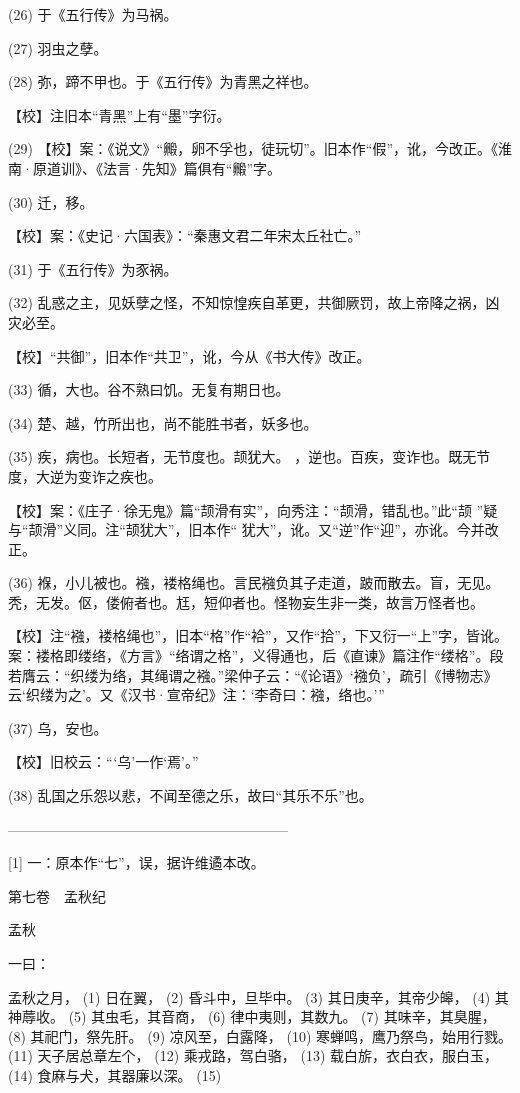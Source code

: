 \documentclass[12pt,UTF8]{ctexbook}
\begin{document}
(26) 于《五行传》为马祸。

(27) 羽虫之孽。

(28) 弥，蹄不甲也。于《五行传》为青黑之祥也。

【校】注旧本“青黑”上有“墨”字衍。

(29) 【校】案：《说文》“毈，卵不孚也，徒玩切”。旧本作“假”，讹，今改正。《淮南·原道训》、《法言·先知》篇俱有“毈”字。

(30) 迁，移。

【校】案：《史记·六国表》：“秦惠文君二年宋太丘社亡。”

(31) 于《五行传》为豕祸。

(32) 乱惑之主，见妖孽之怪，不知惊惶疾自革更，共御厥罚，故上帝降之祸，凶灾必至。

【校】“共御”，旧本作“共卫”，讹，今从《书大传》改正。

(33) 循，大也。谷不熟曰饥。无复有期日也。

(34) 楚、越，竹所出也，尚不能胜书者，妖多也。

(35) 疾，病也。长短者，无节度也。颉犹大。 ，逆也。百疾，变诈也。既无节度，大逆为变诈之疾也。

【校】案：《庄子·徐无鬼》篇“颉滑有实”，向秀注：“颉滑，错乱也。”此“颉 ”疑与“颉滑”义同。注“颉犹大”，旧本作“ 犹大”，讹。又“逆”作“迎”，亦讹。今并改正。

(36) 褓，小儿被也。襁，褛格绳也。言民襁负其子走道，跛而散去。盲，无见。秃，无发。伛，偻俯者也。尪，短仰者也。怪物妄生非一类，故言万怪者也。

【校】注“襁，褛格绳也”，旧本“格”作“袷”，又作“拾”，下又衍一“上”字，皆讹。案：褛格即缕络，《方言》“络谓之格”，义得通也，后《直谏》篇注作“缕格”。段若膺云：“织缕为络，其绳谓之襁。”梁仲子云：“《论语》‘襁负’，疏引《博物志》云‘织缕为之’。又《汉书·宣帝纪》注：‘李奇曰：襁，络也。’”

(37) 乌，安也。

【校】旧校云：“‘乌’一作‘焉’。”

(38) 乱国之乐怨以悲，不闻至德之乐，故曰“其乐不乐”也。




————————————————————

[1] 一：原本作“七”，误，据许维遹本改。





第七卷　孟秋纪



孟秋


一曰：

孟秋之月， (1) 日在翼， (2) 昏斗中，旦毕中。 (3) 其日庚辛，其帝少皞， (4) 其神蓐收。 (5) 其虫毛，其音商， (6) 律中夷则，其数九。 (7) 其味辛，其臭腥， (8) 其祀门，祭先肝。 (9) 凉风至，白露降， (10) 寒蝉鸣，鹰乃祭鸟，始用行戮。 (11) 天子居总章左个， (12) 乘戎路，驾白骆， (13) 载白旂，衣白衣，服白玉， (14) 食麻与犬，其器廉以深。 (15)
\end{document}
